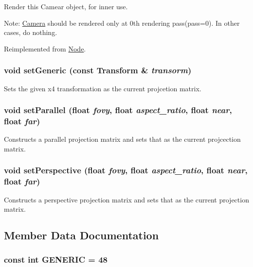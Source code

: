 Render this Camear object, for inner use.

Note: \hyperlink{classm3g_1_1Camera}{Camera} should be rendered only at 0th rendering pass(pass=0). In other cases, do nothing. 

Reimplemented from \hyperlink{classm3g_1_1Node_1efcb1973989d9963d5bd6d03065d389}{Node}.\hypertarget{classm3g_1_1Camera_51c42821097e90d3f59e87676684f60a}{
\subsubsection[{setGeneric}]{\setlength{\rightskip}{0pt plus 5cm}void setGeneric (const {\bf Transform} \& {\em transorm})}}
\label{classm3g_1_1Camera_51c42821097e90d3f59e87676684f60a}


Sets the given x4 transformation as the current projcetion matrix. \hypertarget{classm3g_1_1Camera_88ecc1c18e2d785ca9638e0bec6c5ce2}{
\subsubsection[{setParallel}]{\setlength{\rightskip}{0pt plus 5cm}void setParallel (float {\em fovy}, \/  float {\em aspect\_\-ratio}, \/  float {\em near}, \/  float {\em far})}}
\label{classm3g_1_1Camera_88ecc1c18e2d785ca9638e0bec6c5ce2}


Constructs a parallel projection matrix and sets that as the current projcection matrix. \hypertarget{classm3g_1_1Camera_ca92a48ebe3424deac8e54c27550189d}{
\subsubsection[{setPerspective}]{\setlength{\rightskip}{0pt plus 5cm}void setPerspective (float {\em fovy}, \/  float {\em aspect\_\-ratio}, \/  float {\em near}, \/  float {\em far})}}
\label{classm3g_1_1Camera_ca92a48ebe3424deac8e54c27550189d}


Constructs a perspective projection matrix and sets that as the current projection matrix. 

\subsection{Member Data Documentation}
\hypertarget{classm3g_1_1Camera_48a4e153c97a1f4890558a77dfe02ca4}{
\subsubsection[{GENERIC}]{\setlength{\rightskip}{0pt plus 5cm}const int {\bf GENERIC} = 48}}
\label{classm3g_1_1Camera_48a4e153c97a1f4890558a77dfe02ca4}


